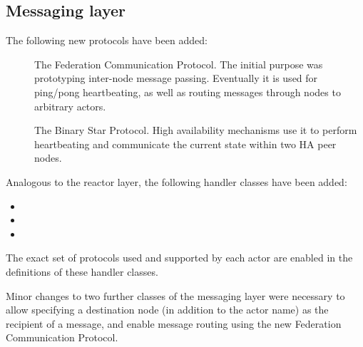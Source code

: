 \subsection{Messaging layer}
The following new protocols have been added:
\begin{description}
	\item [] The Federation Communication
		Protocol. The initial purpose was prototyping inter-node
		message passing. Eventually it is used for ping/pong
		heartbeating, as well as routing messages through nodes to
		arbitrary actors.

	\item [] The Binary Star Protocol. High
		availability mechanisms use it to perform heartbeating and
		communicate the current state within two HA peer nodes.

\end{description}

Analogous to the reactor layer, the following handler classes have been added:
\begin{itemize}
	\item {}
	\item {}
	\item {}
\end{itemize}
The exact set of protocols used and supported by each actor are enabled in the
definitions of these handler classes.

Minor changes to two further classes of the messaging layer were necessary to
allow specifying a destination node (in addition to the actor name) as the
recipient of a message, and enable message routing using the new Federation
Communication Protocol.


